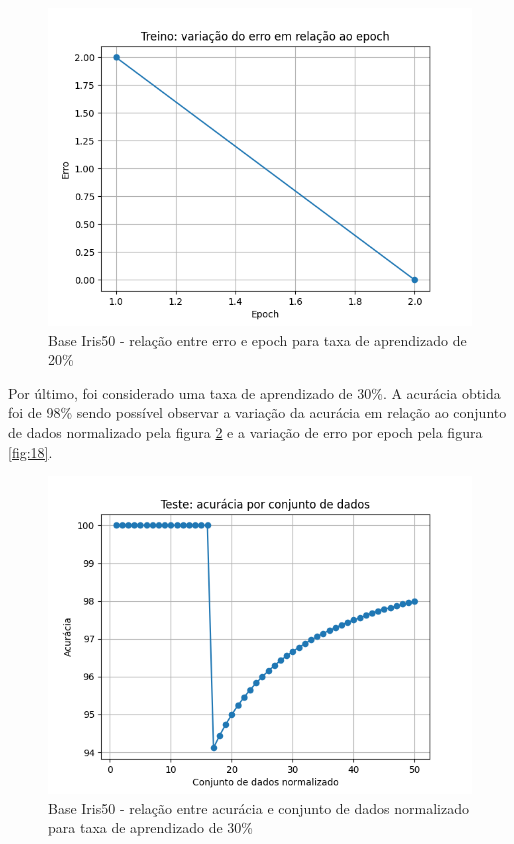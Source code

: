\documentclass[12pt, %
openright, 
oneside, %
a4paper,    %
brazil]{facom-ufu-abntex2}
\begin{document}
\begin{figure}[H]
\centering
\includegraphics[scale=0.9]{figuras/erro_8.png}
\caption{Base Iris50 - relação entre erro e epoch para taxa de aprendizado de 20\%}
\label{fig:16}
\end{figure}

Por último, foi considerado uma taxa de aprendizado de 30\%. A acurácia obtida foi de 98\% sendo possível observar a variação da acurácia em relação ao conjunto de dados normalizado pela figura \ref{fig:17} e a variação de erro por epoch pela figura \ref{fig:18}.

\begin{figure}[H]
\centering
\includegraphics[scale=0.9]{figuras/acuracia_9.png}
\caption{Base Iris50 - relação entre acurácia e conjunto de dados normalizado para taxa de aprendizado de 30\%}
\label{fig:17}
\end{figure}
\end{document}
